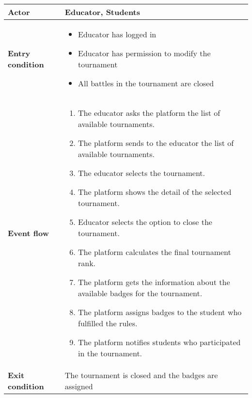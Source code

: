 \begin{enumerate}[label=\textbf{UC\arabic*}:,ref=UC\arabic*,leftmargin=1.3cm]
{\begin{table}[H]
\begin{tabular}{|l|p{11.9cm}|}
                        \textbf{Actor}           & Educator, Students                                         \\\hline
                        \textbf{Entry condition} &
                        \begin{itemize}
                              \item Educator has logged in
                              \item Educator has permission to modify the tournament
                              \item All battles in the tournament are closed
                        \end{itemize}                                 \\\hline
                        \textbf{Event flow}      &
                        \begin{enumerate}[label=\arabic*.]
                              \item The educator asks the platform the list of available tournaments.
                              \item The platform sends to the educator the list of available tournaments.
                              \item The educator selects the tournament.
                              \item The platform shows the detail of the selected tournament.
                              \item Educator selects the option to close the tournament.
                              \item The platform calculates the final tournament rank.
                              \item The platform gets the information about the available badges for the tournament.
                              \item The platform assigns badges to the student who fulfilled the rules.
                              \item The platform notifies students who participated in the tournament.
                        \end{enumerate} \\\hline
                        \textbf{Exit condition}  & The tournament is closed and the badges are assigned       \\\hline

\end{tabular}
\end{table}}
\end{enumerate}
